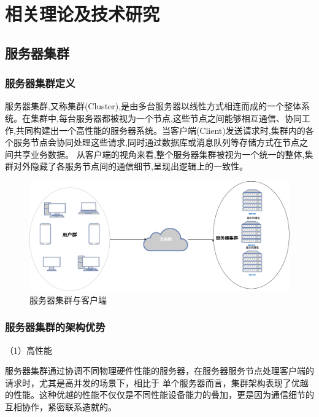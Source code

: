 \chapter{相关理论及技术研究}

\section{服务器集群}

\subsection{服务器集群定义}

服务器集群,又称集群(Cluster),是由多台服务器以线性方式相连而成的一个整体系统。在集群中,每台服务器都被视为一个节点,这些节点之间能够相互通信、协同工作,共同构建出一个高性能的服务器系统\cite{kanellopoulos2022dynamic}。当客户端(Client)发送请求时,集群内的各个服务节点会协同处理这些请求,同时通过数据库或消息队列等存储方式在节点之间共享业务数据。
从客户端的视角来看,整个服务器集群被视为一个统一的整体,集群对外隐藏了各服务节点间的通信细节,呈现出逻辑上的一致性。
\begin{figure}[ht]
	\centering
	\includegraphics[width=\textwidth]{figures/cluster-and-client.png}
	\caption{服务器集群与客户端}
\end{figure}

\subsection{服务器集群的架构优势}

（1）高性能

服务器集群通过协调不同物理硬件性能的服务器，在服务器服务节点处理客户端的请求时，尤其是高并发的场景下，相比于
单个服务器而言，集群架构表现了优越的性能。这种优越的性能不仅仅是不同性能设备能力的叠加，更是因为通信细节的互相协作，紧密联系造就的。

